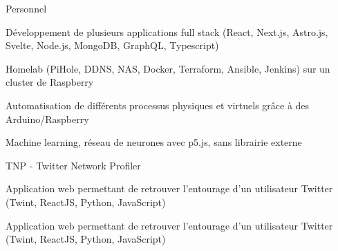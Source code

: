 
\begin{cventries}
  \cventry
    {} %
    {Personnel} %
    {} %
    {} %
    {
      \begin{cvitems} %
        \item {Développement de plusieurs applications full stack (React, Next.js, Astro.js, Svelte, Node.js, MongoDB, GraphQL, Typescript)}
        \item {Homelab (PiHole, DDNS, NAS, Docker, Terraform, Ansible, Jenkins) sur un cluster de Raspberry}
		\item {Automatisation de différents processus physiques et virtuels grâce à des Arduino/Raspberry}
        \item {Machine learning, réseau de neurones avec p5.js, sans librairie externe}
      \end{cvitems}
    }

  \cventry
    {} %
    {TNP - Twitter Network Profiler} %
    {} %
    {} %
    {
      \begin{cvitems} %
      	\item {Application web permettant de retrouver l'entourage d'un utilisateur Twitter (Twint, ReactJS, Python, JavaScript)}
      	\item {Application web permettant de retrouver l'entourage d'un utilisateur Twitter (Twint, ReactJS, Python, JavaScript)}
      \end{cvitems}
    }
\end{cventries}